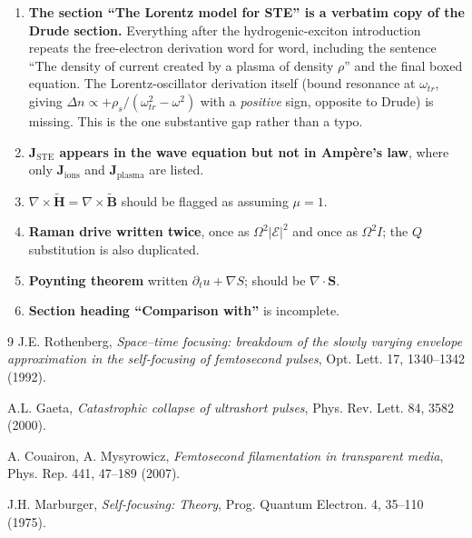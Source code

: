 \documentclass[11pt,a4paper]{article}
\begin{document}
\begin{enumerate}[leftmargin=1.6em]
\item \textbf{The section ``The Lorentz model for STE'' is a verbatim copy of the
Drude section.} Everything after the hydrogenic-exciton introduction repeats the
free-electron derivation word for word, including the sentence ``The density of
current created by a plasma of density $\rho$'' and the final boxed equation.
The Lorentz-oscillator derivation itself (bound resonance at $\omega_{tr}$,
giving $\Delta n \propto +\rho_s/(\omega_{tr}^2-\omega^2)$ with a
\emph{positive} sign, opposite to Drude) is missing. This is the one substantive
gap rather than a typo.

\item \textbf{$\mathbf{J}_{\text{STE}}$ appears in the wave equation but not in
Amp\`ere's law}, where only $\mathbf{J}_{\text{ions}}$ and
$\mathbf{J}_{\text{plasma}}$ are listed.

\item \textbf{$\nabla\times\tilde{\mathbf H}=\nabla\times\tilde{\mathbf B}$}
should be flagged as assuming $\mu=1$.

\item \textbf{Raman drive written twice}, once as $\Omega^2|\mathcal{E}|^2$ and
once as $\Omega^2 I$; the $Q$ substitution is also duplicated.

\item \textbf{Poynting theorem} written $\partial_t u+\nabla S$; should be
$\nabla\!\cdot\!\mathbf{S}$.

\item \textbf{Section heading ``Comparison with''} is incomplete.
\end{enumerate}

\begin{thebibliography}{9}
J.E. Rothenberg,
\textit{Space--time focusing: breakdown of the slowly varying envelope
approximation in the self-focusing of femtosecond pulses},
Opt. Lett. 17, 1340--1342 (1992).

A.L. Gaeta,
\textit{Catastrophic collapse of ultrashort pulses},
Phys. Rev. Lett. 84, 3582 (2000).

A. Couairon, A. Mysyrowicz,
\textit{Femtosecond filamentation in transparent media},
Phys. Rep. 441, 47--189 (2007).

J.H. Marburger,
\textit{Self-focusing: Theory},
Prog. Quantum Electron. 4, 35--110 (1975).
\end{thebibliography}
\end{document}
